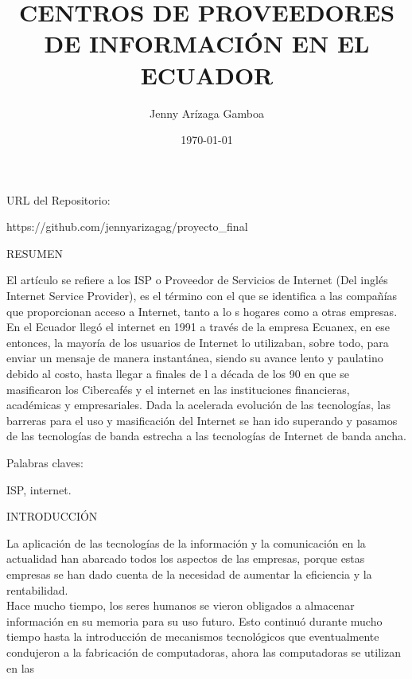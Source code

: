 \documentclass[a4paper,11pt]{article}
\begin{document}
\title{CENTROS DE PROVEEDORES DE INFORMACIÓN EN EL ECUADOR}
\author{Jenny Arízaga Gamboa}
\date{\today}
\maketitle
\begin{bf}
URL del Repositorio:
\end{bf}
https://github.com/jennyarizagag/proyecto\_final
\begin{bf}
\begin{center}
RESUMEN \\
\end{center}
\end{bf}
El artículo se refiere a los ISP o Proveedor de Servicios de Internet (Del inglés Internet Service Provider),
es el término con el que se identifica a las compañías que proporcionan acceso a Internet, tanto a lo
s hogares como a otras empresas. En el Ecuador lleg\'o el internet en 1991 a trav\'es de la empresa Ecuanex,
en ese entonces, la mayoría de los usuarios de Internet lo utilizaban, sobre todo, para enviar un mensaje 
de manera instant\'anea, siendo su avance lento y paulatino debido al costo, hasta llegar a finales de l
a d\'ecada de los 90 en que se masificaron los Cibercaf\'es y el internet en las instituciones financieras, 
acad\'emicas y empresariales. Dada la acelerada evoluci\'on de las tecnolog\'ias, las barreras para el uso 
y masificaci\'on del Internet se han ido superando y pasamos de las tecnolog\'ias de banda estrecha a las 
tecnolog\'ias de Internet de banda ancha.\\   
\begin{bf}
Palabras claves:
\end{bf}
ISP, internet. \\
\begin{bf}
\begin{center}
INTRODUCCI\'ON\\
\end{center}
\end{bf}
La aplicaci\'on de las tecnolog\'ias de la informaci\'on y la comunicaci\'on en la actualidad han abarcado 
todos los aspectos de las empresas, porque estas empresas se han dado cuenta de la necesidad de aumentar 
la eficiencia y la rentabilidad.\\
Hace mucho tiempo, los seres humanos se vieron obligados a almacenar informaci\'on en su memoria para su 
uso futuro. Esto continu\'o durante mucho tiempo hasta la introducci\'on de mecanismos tecnol\'ogicos que 
eventualmente condujeron a la fabricaci\'on de computadoras, ahora las computadoras se utilizan en las 
\end{document}
